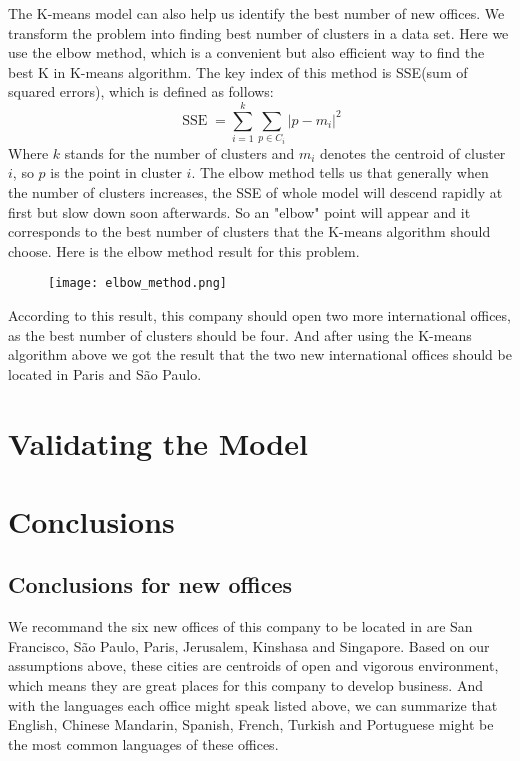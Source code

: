 \documentclass{mcmthesis}
\begin{document}
  \indent \indent The K-means model can also help us identify the best number of new offices. We transform the problem into finding best number of clusters in a data set. Here we use the elbow method, which is a convenient but also efficient way to find the best K in K-means algorithm. The key index of this method is SSE(sum of squared errors), which is defined as follows:
  \begin{equation}
    \mathop{SSE} = \sum^k_{i=1}\sum_{p\in C_i}\left|p-m_i\right|^2
  \end{equation}
  \indent Where $k$ stands for the number of clusters and $m_i$ denotes the centroid of cluster $i$, so $p$ is the point in cluster $i$. The elbow method tells us that generally when the number of clusters increases, the SSE of whole model will descend rapidly at first but slow down soon afterwards. So an "elbow" point will appear and it corresponds to the best number of clusters that the K-means algorithm should choose. Here is the elbow method result for this problem.

  \begin{figure}[h]
    \small
    \centering
    \texttt{[image: elbow\_method.png]}
  \end{figure}

  \indent According to this result, this company should open two more international offices, as the best number of clusters should be four. And after using the K-means algorithm above we got the result that the two new international offices should be located in Paris and São Paulo.
  
\section{Validating the Model}

\section{Conclusions}

\subsection{Conclusions for new offices}
\indent \indent We recommand the six new offices of this company to be located in are San Francisco, São Paulo, Paris, Jerusalem, Kinshasa and Singapore. Based on our assumptions above, these cities are centroids of open and vigorous environment, which means they are great places for this company to develop business. And with the languages each office might speak listed above, we can summarize that English, Chinese Mandarin, Spanish, French, Turkish and Portuguese might be the most common languages of these offices.
\end{document}
